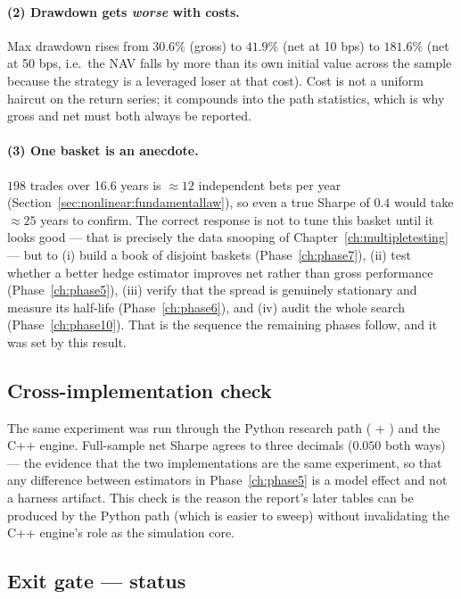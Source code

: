 \paragraph{(2) Drawdown gets \emph{worse} with costs.} Max drawdown rises from $30.6\%$
(gross) to $41.9\%$ (net at 10 bps) to $181.6\%$ (net at 50 bps, i.e.\ the NAV falls by
more than its own initial value across the sample because the strategy is a leveraged
loser at that cost). Cost is not a uniform haircut on the return series; it compounds into
the path statistics, which is why gross and net must both always be reported.

\paragraph{(3) One basket is an anecdote.} $198$ trades over 16.6 years is
$\approx12$ independent bets per year (Section~\ref{sec:nonlinear:fundamentallaw}), so
even a true Sharpe of $0.4$ would take $\approx25$ years to confirm. The correct response
is not to tune this basket until it looks good --- that is precisely the data snooping of
Chapter~\ref{ch:multipletesting} --- but to (i) build a book of disjoint baskets
(Phase~\ref{ch:phase7}), (ii) test whether a better hedge estimator improves net rather
than gross performance (Phase~\ref{ch:phase5}), (iii) verify that the spread is genuinely
stationary and measure its half-life (Phase~\ref{ch:phase6}), and (iv) audit the whole
search (Phase~\ref{ch:phase10}). That is the sequence the remaining phases follow, and it
was set by this result.

\subsection{Cross-implementation check}

The same experiment was run through the Python research path
( + ) and the C++
engine. Full-sample net Sharpe agrees to three decimals ($0.050$ both ways) --- the
evidence that the two implementations are the same experiment, so that any difference
between estimators in Phase~\ref{ch:phase5} is a model effect and not a harness artifact.
This check is the reason the report's later tables can be produced by the Python path
(which is easier to sweep) without invalidating the C++ engine's role as the simulation
core.

\subsection{Exit gate --- status}


